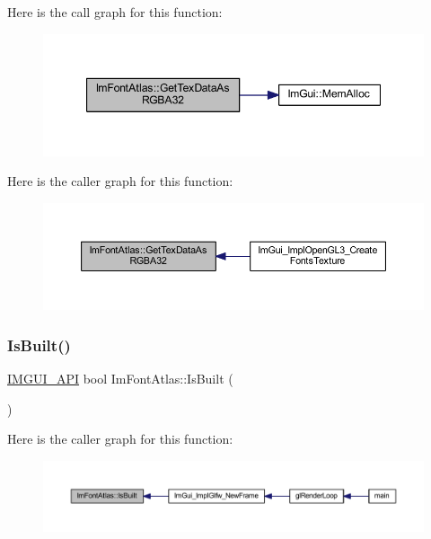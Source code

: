 Here is the call graph for this function\+:
\nopagebreak
\begin{figure}[H]
\begin{center}
\leavevmode
\includegraphics[width=347pt]{struct_im_font_atlas_a8abb0c4e67ebb38249d4df71218c4eec_cgraph}
\end{center}
\end{figure}
Here is the caller graph for this function\+:
\nopagebreak
\begin{figure}[H]
\begin{center}
\leavevmode
\includegraphics[width=350pt]{struct_im_font_atlas_a8abb0c4e67ebb38249d4df71218c4eec_icgraph}
\end{center}
\end{figure}
\mbox{\label{struct_im_font_atlas_a1819275e3e52fe14824454490b502250}} 
\subsubsection{\texorpdfstring{Is\+Built()}{IsBuilt()}}
{\footnotesize\ttfamily \mbox{\hyperlink{imgui_8h_a43829975e84e45d1149597467a14bbf5}{I\+M\+G\+U\+I\+\_\+\+A\+PI}} bool Im\+Font\+Atlas\+::\+Is\+Built (\begin{DoxyParamCaption}{ }\end{DoxyParamCaption})\hspace{0.3cm}{\ttfamily [inline]}}

Here is the caller graph for this function\+:
\nopagebreak
\begin{figure}[H]
\begin{center}
\leavevmode
\includegraphics[width=350pt]{struct_im_font_atlas_a1819275e3e52fe14824454490b502250_icgraph}
\end{center}
\end{figure}
\mbox{\label{struct_im_font_atlas_a96ffd1956c11dac4f79b43c095828445}} 

